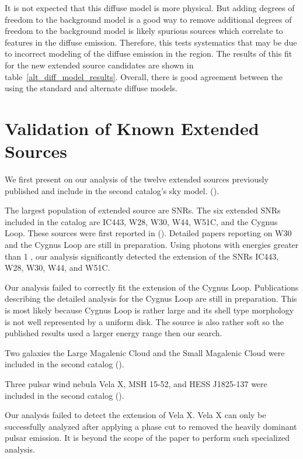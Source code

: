 \documentclass[12pt,preprint]{aastex}
\newcommand{\gev}{\text{GeV}\xspace}
\newcommand{\ts}{\text{TS}\xspace}
\begin{document}
It is not expected that this diffuse model is more physical.
But adding degrees of freedom to the background model is a good
way to remove additional degrees of freedom to the background
model is likely spurious sources which correlate to features in
the diffuse emission.  Therefore, this tests systematics that may
be due to incorrect modeling of the diffuse emission in the region.
The results of this fit for the new extended source candidates are shown
in table~\ref{alt_diff_model_results}. Overall, there is good agreement
between the \ts using the standard and alternate diffuse models.


\section{Validation of Known Extended Sources}
\label{validate_known}

We first present on our analysis of the twelve extended sources
previously published and include in the second catalog's sky model.
(\cite{second_cat}).


The largest population of extended source are SNRs. The six extended SNRs
included in the catalog are IC443, W28, W30, W44, W51C, and the Cygnus
Loop. These sources were first reported in (\cite{ic443,w28,w44,w51c}).
Detailed papers reporting on W30 and the Cygnus Loop are still in
preparation.  Using photons with energies greater than 1 \gev, our
analysis significantly detected the extension of the SNRs IC443, W28,
W30, W44, and W51C.

Our analysis failed to correctly fit the extension of the Cygnus Loop.
Publications describing the detailed analysis for the Cygnus Loop are
still in preparation.  This is most likely because Cygnus Loop is rather
large and its shell type morphology is not well represented by a uniform
disk. The source is also rather soft so the published results used a
larger energy range then our search.



Two galaxies the Large Magalenic Cloud and the Small Magalenic Cloud 
were included in the second catalog (\cite{lmc,smc}).  

Three pulsar wind nebula Vela X, MSH 15-52, and HESS J1825-137 
were included in the second catalog (\cite{velax,msh1552,fermi_hess_j1825}).

Our analysis failed to detect the extension of Vela X. Vela X can only be
successfully analyzed after applying a phase cut to removed the heavily
dominant pulsar emission. It is beyond the scope of the paper to perform
such specialized analysis.
\end{document}

